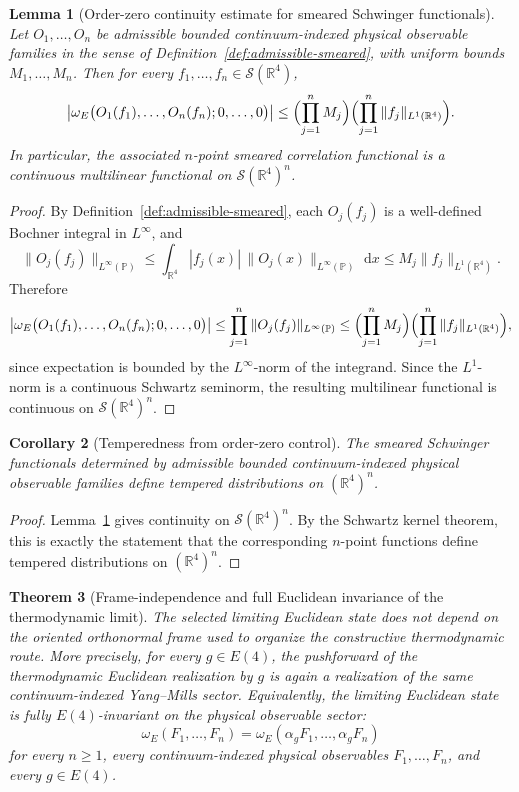 \documentclass[11pt]{article}
\newtheorem{theorem}{Theorem}[section]
\newtheorem{lemma}[theorem]{Lemma}
\newtheorem{corollary}[theorem]{Corollary}
\theoremstyle{definition}
\theoremstyle{remark}
\newcommand{\R}{\mathbb R}
\newcommand{\dd}{\,\mathrm d}
\begin{document}
\begin{lemma}[Order-zero continuity estimate for smeared Schwinger functionals]
\label{lem:schwartz-continuity}
Let \(O_1,\dots,O_n\) be admissible bounded continuum-indexed physical
observable families in the sense of Definition~\ref{def:admissible-smeared},
with uniform bounds \(M_1,\dots,M_n\).  Then for every
\(f_1,\dots,f_n\in\mathcal S(\R^4)\),
\[
\bigl|
\omega_E\bigl(O_1(f_1),\dots,O_n(f_n);0,\dots,0\bigr)
\bigr|
\le
\Bigl(\prod_{j=1}^n M_j\Bigr)\Bigl(\prod_{j=1}^n \|f_j\|_{L^1(\R^4)}\Bigr).
\]
In particular, the associated \(n\)-point smeared correlation functional is a
continuous multilinear functional on \(\mathcal S(\R^4)^n\).
\end{lemma}

\begin{proof}
By Definition~\ref{def:admissible-smeared}, each \(O_j(f_j)\) is a well-defined
Bochner integral in \(L^\infty\), and
\[
\|O_j(f_j)\|_{L^\infty(\mathbb P)}
\le
\int_{\R^4}|f_j(x)|\,\|O_j(x)\|_{L^\infty(\mathbb P)}\,\dd x
\le
M_j\|f_j\|_{L^1(\R^4)}.
\]
Therefore
\[
\bigl|
\omega_E\bigl(O_1(f_1),\dots,O_n(f_n);0,\dots,0\bigr)
\bigr|
\le
\prod_{j=1}^n \|O_j(f_j)\|_{L^\infty(\mathbb P)}
\le
\Bigl(\prod_{j=1}^n M_j\Bigr)\Bigl(\prod_{j=1}^n \|f_j\|_{L^1(\R^4)}\Bigr),
\]
since expectation is bounded by the \(L^\infty\)-norm of the integrand.  Since the \(L^1\)-norm is a
continuous Schwartz seminorm, the resulting multilinear functional is
continuous on \(\mathcal S(\R^4)^n\).
\end{proof}

\begin{corollary}[Temperedness from order-zero control]
\label{cor:temperedness}
The smeared Schwinger functionals determined by admissible bounded
continuum-indexed physical observable families define tempered distributions on
\((\R^4)^n\).
\end{corollary}

\begin{proof}
Lemma~\ref{lem:schwartz-continuity} gives continuity on
\(\mathcal S(\R^4)^n\).  By the Schwartz kernel theorem, this is exactly the
statement that the corresponding \(n\)-point functions define tempered
distributions on \((\R^4)^n\).
\end{proof}

\begin{theorem}[Frame-independence and full Euclidean invariance of the thermodynamic limit]
\label{thm:symmetry-restoration}
The selected limiting Euclidean state does not depend on the oriented
orthonormal frame used to organize the constructive thermodynamic route.  More
precisely, for every \(g\in E(4)\), the pushforward of the thermodynamic
Euclidean realization by \(g\) is again a realization of the same
continuum-indexed Yang--Mills sector.  Equivalently, the limiting Euclidean
state is fully \(E(4)\)-invariant on the physical observable sector:
\[
\omega_E(F_1,\dots,F_n)
=
\omega_E(\alpha_gF_1,\dots,\alpha_gF_n)
\]
for every \(n\ge1\), every continuum-indexed physical observables
\(F_1,\dots,F_n\), and every \(g\in E(4)\).
\end{theorem}
\end{document}

